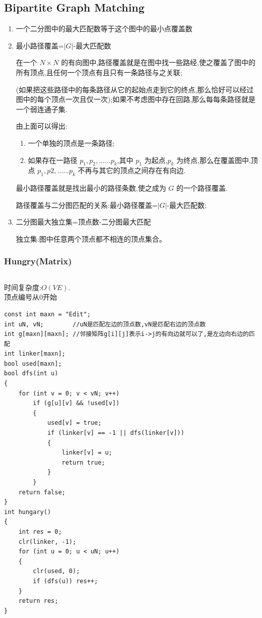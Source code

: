 \documentclass[twoside]{article}
\begin{document}
\subsection{Bipartite Graph Matching}
\begin{enumerate}
\item 一个二分图中的最大匹配数等于这个图中的最小点覆盖数

\item 最小路径覆盖=$|G|$-最大匹配数

在一个 $N \times N$ 的有向图中,路径覆盖就是在图中找一些路经,使之覆盖了图中的所有顶点,且任何一个顶点有且只有一条路径与之关联;

(如果把这些路径中的每条路径从它的起始点走到它的终点,那么恰好可以经过图中的每个顶点一次且仅一次);如果不考虑图中存在回路,那么每每条路径就是一个弱连通子集.

由上面可以得出:

\begin{enumerate}
\item 一个单独的顶点是一条路径;

\item 如果存在一路径 $p_1,p_2,......p_k$,其中 $p_1$ 为起点,$p_k$ 为终点,那么在覆盖图中,顶点 $p_1,p2,......p_k$ 不再与其它的顶点之间存在有向边.
\end{enumerate}

最小路径覆盖就是找出最小的路径条数,使之成为 $G$ 的一个路径覆盖.

路径覆盖与二分图匹配的关系:最小路径覆盖=$|G|$-最大匹配数;

\item 二分图最大独立集=顶点数-二分图最大匹配

独立集:图中任意两个顶点都不相连的顶点集合。
\end{enumerate}
\subsubsection{Hungry(Matrix)}
\begin{lstlisting}
\end{lstlisting}
时间复杂度:$O(VE)$.\\
顶点编号从0开始
\begin{lstlisting}
const int maxn = "Edit";
int uN, vN;        //uN是匹配左边的顶点数,vN是匹配右边的顶点数
int g[maxn][maxn]; //邻接矩阵g[i][j]表示i->j的有向边就可以了,是左边向右边的匹配
int linker[maxn];
bool used[maxn];
bool dfs(int u)
{
    for (int v = 0; v < vN; v++)
        if (g[u][v] && !used[v])
        {
            used[v] = true;
            if (linker[v] == -1 || dfs(linker[v]))
            {
                linker[v] = u;
                return true;
            }
        }
    return false;
}
int hungary()
{
    int res = 0;
    clr(linker, -1);
    for (int u = 0; u < uN; u++)
    {
        clr(used, 0);
        if (dfs(u)) res++;
    }
    return res;
}
\end{lstlisting}
\end{document}
